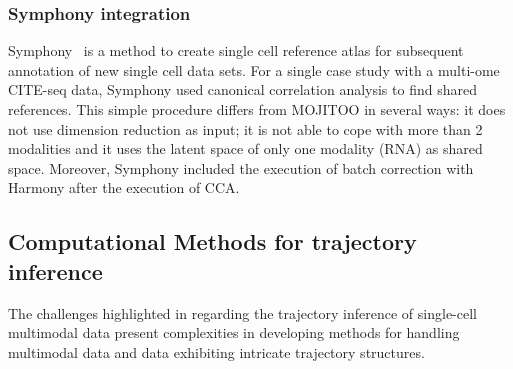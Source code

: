 \subsubsection{Symphony integration}
Symphony~\cite{kang2021symphony} is a method to create single cell reference atlas for subsequent annotation of new single cell data sets. For a single case study with a multi-ome CITE-seq data, Symphony used canonical correlation analysis to find shared references. This simple procedure differs from MOJITOO in several ways: it does not use dimension reduction as input; it is not able to cope with more than 2 modalities and it uses the latent space of only one modality (RNA) as shared space.  Moreover, Symphony included the execution of batch correction with Harmony after the execution of CCA.

\label{background:sec2:TI}
\subsection{Computational Methods for trajectory inference}
 The challenges highlighted in  regarding the trajectory inference of single-cell multimodal data present complexities in developing methods for handling multimodal data and data exhibiting intricate trajectory structures. 


